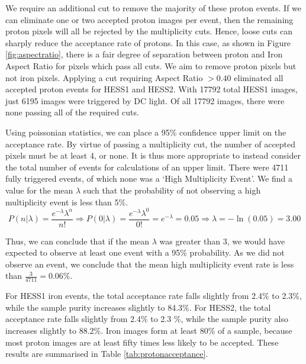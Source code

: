 \documentclass[11pt]{article}
\begin{document}
We require an additional cut to remove the majority of these proton events. If we can eliminate one or two accepted proton images per event, then the remaining proton pixels will all be rejected by the multiplicity cuts. Hence, loose cuts can sharply reduce the acceptance rate of protons. In this case, as shown in Figure \ref{fig:aspectratio}, there is a fair degree of separation between proton and Iron Aspect Ratio for pixels which pass all cuts. We aim to remove proton pixels but not iron pixels. Applying a cut requiring Aspect Ratio $> 0.40$ eliminated all accepted proton events for HESS1 and HESS2. With 17792 total HESS1 images, just 6195 images were triggered by DC light. Of all 17792 images, there were none passing all of the required cuts. 

Using poissonian statistics, we can place a 95\% confidence upper limit on the acceptance rate. By virtue of passing a multiplicity cut, the number of accepted pixels must be at least 4, or none. It is thus more appropriate to instead consider the total number of events for calculations of an upper limit. There were 4711 fully triggered events, of which none was a \textquoteleft High Multiplicity Event'. We find a value for the mean $\lambda$ such that the probability of not observing a high multiplicity event is less than 5\%.
\[ P(n|\lambda)=\frac{e^{-\lambda}\lambda^{n}}{n!} \Longrightarrow P(0|\lambda)=\frac{e^{-\lambda}\lambda^{0}}{0!}=e^{-\lambda}=0.05
\Longrightarrow
\lambda = -\ln(0.05)=3.00\]

Thus, we can conclude that if the mean $\lambda$ was greater than 3, we would have expected to observe at least one event with a 95\% probability. As we did not observe an event, we conclude that the mean high multiplicity event rate is less than $\frac{3}{4711}=0.06\%$. 

For HESS1 iron events, the total acceptance rate falls slightly from 2.4\% to 2.3\%, while the sample purity increases slightly to 84.3\%. For HESS2, the total acceptance rate falls slightly from 2.4\% to 2.3 \%, while the sample purity also increases slightly to 88.2\%. Iron images form at least 80\% of a sample, because most proton images are at least fifty times less likely to be accepted. These results are summarised in Table \ref{tab:protonacceptance}.
\end{document}
